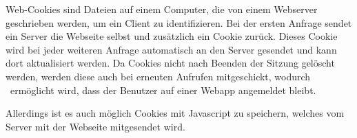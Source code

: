 
Web-Cookies sind Dateien auf einem Computer, die von einem Webserver geschrieben werden, um ein Client zu identifizieren. 
Bei der ersten Anfrage sendet ein Server die Webseite selbst und zusätzlich ein Cookie zurück. 
Dieses Cookie wird bei jeder weiteren Anfrage automatisch an den Server gesendet und kann dort aktualisiert werden. 
Da Cookies nicht nach Beenden der Sitzung gelöscht werden, werden diese auch bei erneuten Aufrufen mitgeschickt, wodurch \zb\ ermöglicht wird, dass der Benutzer auf einer Webapp angemeldet bleibt. 

Allerdings ist es auch möglich Cookies mit Javascript zu speichern, welches vom Server mit der Webseite mitgesendet wird. 
\cite{wikiCookies}
